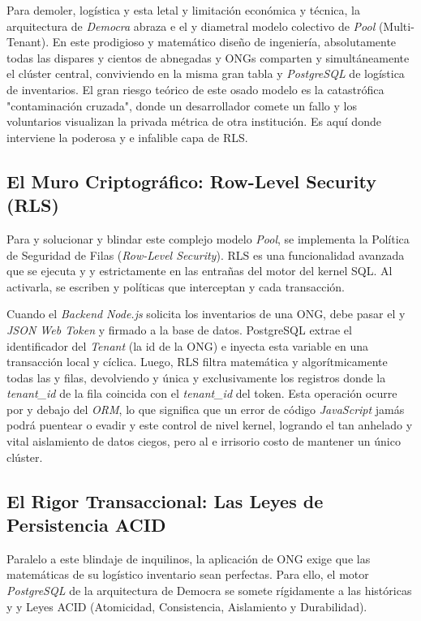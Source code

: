 Para demoler, logística y esta letal y limitación económica y técnica, la arquitectura de \textit{Democra} abraza e el y diametral modelo colectivo de \textit{Pool} (Multi-Tenant). En este prodigioso y matemático diseño de ingeniería, absolutamente todas las dispares y cientos de abnegadas y ONGs comparten y simultáneamente el clúster central, conviviendo en la misma gran tabla y \textit{PostgreSQL} de logística de inventarios. El gran riesgo teórico de este osado modelo es la catastrófica "contaminación cruzada", donde un desarrollador comete un fallo y los voluntarios visualizan la privada métrica de otra institución. Es aquí donde interviene la poderosa y e infalible capa de RLS.

\subsection{El Muro Criptográfico: Row-Level Security (RLS)}

Para y solucionar y blindar este complejo modelo \textit{Pool}, se implementa la Política de Seguridad de Filas (\textit{Row-Level Security}). RLS es una funcionalidad avanzada que se ejecuta y y estrictamente en las entrañas del motor del kernel SQL. Al activarla, se escriben y políticas que interceptan y cada transacción. 

Cuando el \textit{Backend} \textit{Node.js} solicita los inventarios de una ONG, debe pasar el y \textit{JSON Web Token} y firmado a la base de datos. PostgreSQL extrae el identificador del \textit{Tenant} (la id de la ONG) e inyecta esta variable en una transacción local y cíclica. Luego, RLS filtra matemática y algorítmicamente todas las y filas, devolviendo y única y exclusivamente los registros donde la \textit{tenant\_id} de la fila coincida con el \textit{tenant\_id} del token. Esta operación ocurre por y debajo del \textit{ORM}, lo que significa que un error de código \textit{JavaScript} jamás podrá puentear o evadir y este control de nivel kernel, logrando el tan anhelado y vital aislamiento de datos ciegos, pero al e irrisorio costo de mantener un único clúster.

\subsection{El Rigor Transaccional: Las Leyes de Persistencia ACID}

Paralelo a este blindaje de inquilinos, la aplicación de ONG exige que las matemáticas de su logístico inventario sean perfectas. Para ello, el motor \textit{PostgreSQL} de la arquitectura de Democra se somete rígidamente a las históricas y y Leyes ACID (Atomicidad, Consistencia, Aislamiento y Durabilidad).

